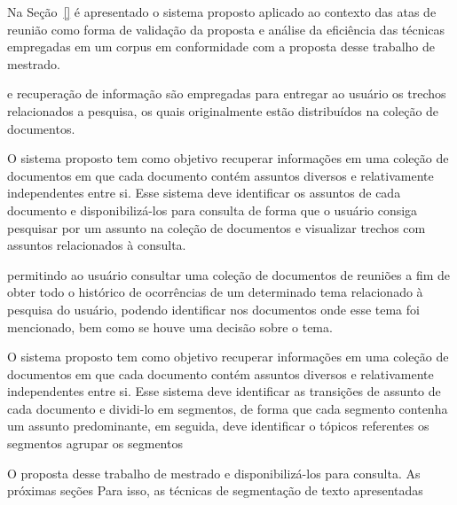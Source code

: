 Na Seção~\ref{} é apresentado o sistema proposto aplicado ao contexto das atas de reunião como forma de validação da proposta e análise da eficiência das técnicas empregadas em um corpus em conformidade com a proposta desse trabalho de mestrado.

e recuperação de informação são empregadas para entregar ao usuário os trechos relacionados a pesquisa, os quais originalmente estão distribuídos na coleção de documentos.









 


O sistema proposto tem como objetivo recuperar informações em uma coleção de documentos em que cada documento contém assuntos diversos e relativamente independentes entre si. Esse sistema deve identificar os assuntos de cada documento e disponibilizá-los para consulta de forma que o usuário consiga pesquisar por um assunto na coleção de documentos e visualizar trechos com assuntos relacionados à consulta.

permitindo ao usuário consultar uma coleção de documentos de reuniões a fim de obter todo o histórico de ocorrências de um determinado tema relacionado à pesquisa do usuário, podendo identificar nos documentos onde esse tema foi mencionado, bem como se houve uma decisão sobre o tema.



O sistema proposto tem como objetivo recuperar informações em uma coleção de documentos em que cada documento contém assuntos diversos e relativamente independentes entre si. 
Esse sistema deve identificar as transições de assunto de cada documento e dividi-lo em segmentos, de forma que cada segmento contenha um assunto predominante, 
em seguida, deve identificar o tópicos referentes os segmentos agrupar os segmentos 





O proposta desse trabalho de mestrado 
e disponibilizá-los para consulta.
As próximas seções 
Para isso, as técnicas de segmentação de texto apresentadas 


